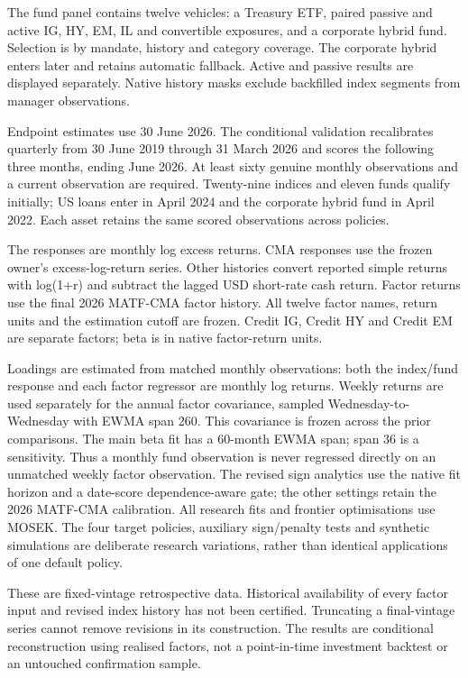 \documentclass[a4paper,review]{cas-sc}
\begin{document}
The fund panel contains twelve vehicles: a Treasury ETF, paired passive and active IG, HY, EM, IL and convertible exposures, and a corporate hybrid fund. Selection is by mandate, history and category coverage. The corporate hybrid enters later and retains automatic fallback. Active and passive results are displayed separately. Native history masks exclude backfilled index segments from manager observations.

Endpoint estimates use 30 June 2026. The conditional validation recalibrates quarterly from 30 June 2019 through 31 March 2026 and scores the following three months, ending June 2026. At least sixty genuine monthly observations and a current observation are required. Twenty-nine indices and eleven funds qualify initially; US loans enter in April 2024 and the corporate hybrid fund in April 2022. Each asset retains the same scored observations across policies.

The responses are monthly log excess returns. CMA responses use the frozen owner's excess-log-return series. Other histories convert reported simple returns with log(1+r) and subtract the lagged USD short-rate cash return. Factor returns use the final 2026 MATF-CMA factor history. All twelve factor names, return units and the estimation cutoff are frozen. Credit IG, Credit HY and Credit EM are separate factors; beta is in native factor-return units.

Loadings are estimated from matched monthly observations: both the index/fund response and each factor regressor are monthly log returns. Weekly returns are used separately for the annual factor covariance, sampled Wednesday-to-Wednesday with EWMA span 260. This covariance is frozen across the prior comparisons. The main beta fit has a 60-month EWMA span; span 36 is a sensitivity. Thus a monthly fund observation is never regressed directly on an unmatched weekly factor observation. The revised sign analytics use the native fit horizon and a date-score dependence-aware gate; the other settings retain the 2026 MATF-CMA calibration. All research fits and frontier optimisations use MOSEK. The four target policies, auxiliary sign/penalty tests and synthetic simulations are deliberate research variations, rather than identical applications of one default policy.

These are fixed-vintage retrospective data. Historical availability of every factor input and revised index history has not been certified. Truncating a final-vintage series cannot remove revisions in its construction. The results are conditional reconstruction using realised factors, not a point-in-time investment backtest or an untouched confirmation sample.
\end{document}
